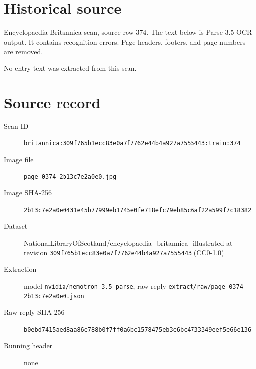 \documentclass{article}
\begin{document}
\section*{Historical source}
Encyclopaedia Britannica scan, source row 374. The text below is Parse 3.5 OCR output. It contains recognition errors.
Page headers, footers, and page numbers are removed.

No entry text was extracted from this scan.

\section*{Source record}
\begin{description}
\item[Scan ID] \texttt{britannica:309f765b1ecc83e0a7f7762e44b4a927a7555443:train:374}
\item[Image file] \texttt{page-0374-2b13c7e2a0e0.jpg}
\item[Image SHA-256] \texttt{2b13c7e2a0e0431e45b77999eb1745e0fe718efc79eb85c6af22a599f7c18382}
\item[Dataset] NationalLibraryOfScotland/encyclopaedia\_britannica\_illustrated at revision \texttt{309f765b1ecc83e0a7f7762e44b4a927a7555443} (CC0-1.0)
\item[Extraction] model \texttt{nvidia/nemotron-3.5-parse}, raw reply \texttt{extract/raw/page-0374-2b13c7e2a0e0.json}
\item[Raw reply SHA-256] \texttt{b0ebd7415aed8aa86e788b0f7ff0a6bc1578475eb3e6bc4733349eef5e66e136}

\item[Running header] none
\end{description}
\end{document}
